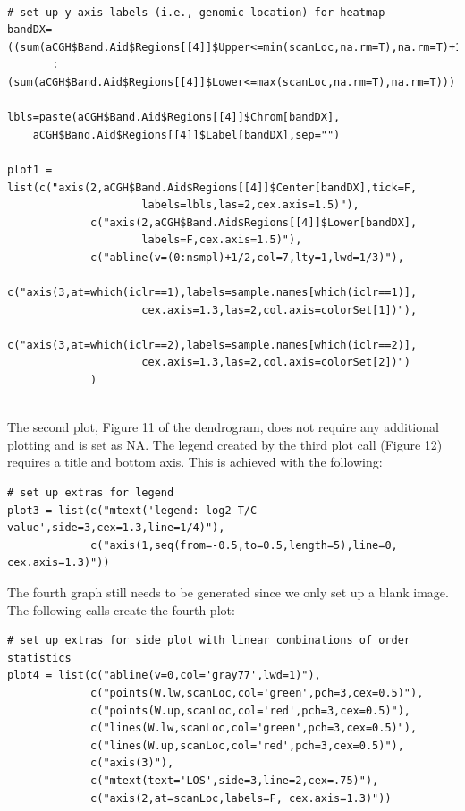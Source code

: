 \documentclass[]{article}
\begin{document}
\begin{verbatim}

# set up y-axis labels (i.e., genomic location) for heatmap
bandDX=((sum(aCGH$Band.Aid$Regions[[4]]$Upper<=min(scanLoc,na.rm=T),na.rm=T)+1)
       :(sum(aCGH$Band.Aid$Regions[[4]]$Lower<=max(scanLoc,na.rm=T),na.rm=T)))
  
lbls=paste(aCGH$Band.Aid$Regions[[4]]$Chrom[bandDX],
    aCGH$Band.Aid$Regions[[4]]$Label[bandDX],sep="")

plot1 = list(c("axis(2,aCGH$Band.Aid$Regions[[4]]$Center[bandDX],tick=F,
                     labels=lbls,las=2,cex.axis=1.5)"),
             c("axis(2,aCGH$Band.Aid$Regions[[4]]$Lower[bandDX],
                     labels=F,cex.axis=1.5)"),
             c("abline(v=(0:nsmpl)+1/2,col=7,lty=1,lwd=1/3)"),
             c("axis(3,at=which(iclr==1),labels=sample.names[which(iclr==1)],
                     cex.axis=1.3,las=2,col.axis=colorSet[1])"),
             c("axis(3,at=which(iclr==2),labels=sample.names[which(iclr==2)],
                     cex.axis=1.3,las=2,col.axis=colorSet[2])")
             )


\end{verbatim}




\indent The second plot, Figure 11 of the  dendrogram, does not require any additional plotting and is set as NA. The legend created by the third plot call (Figure 12) requires a title and bottom axis. This is achieved with the following:

\begin{verbatim}
# set up extras for legend
plot3 = list(c("mtext('legend: log2 T/C value',side=3,cex=1.3,line=1/4)"),
             c("axis(1,seq(from=-0.5,to=0.5,length=5),line=0, cex.axis=1.3)"))

\end{verbatim}



\indent The fourth graph still needs to be generated since we only set up a blank image. The following calls create the fourth plot:

\begin{verbatim}
# set up extras for side plot with linear combinations of order statistics
plot4 = list(c("abline(v=0,col='gray77',lwd=1)"),
             c("points(W.lw,scanLoc,col='green',pch=3,cex=0.5)"),
             c("points(W.up,scanLoc,col='red',pch=3,cex=0.5)"),
             c("lines(W.lw,scanLoc,col='green',pch=3,cex=0.5)"),
             c("lines(W.up,scanLoc,col='red',pch=3,cex=0.5)"),
             c("axis(3)"),
             c("mtext(text='LOS',side=3,line=2,cex=.75)"),
             c("axis(2,at=scanLoc,labels=F, cex.axis=1.3)"))

\end{verbatim}
\end{document}
